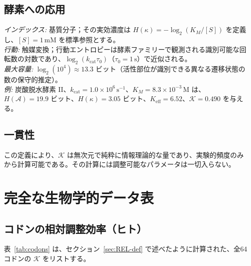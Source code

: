 \documentclass[12pt,a4paper]{ltjsarticle}
\newcommand{\REL}{\mathcal{K}}          %
\newcommand{\ABS}{K_{\mathrm{eff}}}     %
\begin{document}
	\subsection{酵素への応用}
	\textit{インデックス:} 基質分子；その実効濃度は \(H(\kappa) = -\log_2(K_M/[S])\) を定義し、\([S]=1\,\text{mM}\) を標準参照とする。\\
	\textit{行動:} 触媒変換；行動エントロピーは酵素ファミリーで観測される識別可能な回転数の対数であり、\(\log_2(k_{\mathrm{cat}}\tau_0)\)（\(\tau_0=1\,\text{s}\)）で近似される。\\
	\textit{最大容量:} \(\log_2(10^4)\approx13.3\) ビット（活性部位が識別できる異なる遷移状態の数の保守的推定）。\\
	\textit{例:} 炭酸脱水酵素 II、\(k_{\mathrm{cat}}=1.0\times10^6\,\text{s}^{-1}\)、\(K_M=8.3\times10^{-3}\,\text{M}\) は、\(H(\mathcal{A})=19.9\) ビット、\(H(\kappa)=3.05\) ビット、\(\ABS=6.52\)、\(\REL=0.490\) を与える。
	
	\subsection{一貫性}
	この定義により、\(\REL\) は無次元で純粋に情報理論的な量であり、実験的頻度のみから計算可能である。その計算には調整可能なパラメータは一切入らない。
	
	\section{完全な生物学的データ表}
	\label{sec:tables}
	
	\subsection{コドンの相対調整効率（ヒト）}
	\label{sec:codons}
	表~\ref{tab:codons} は、セクション~\ref{sec:REL-def} で述べたように計算された、全64コドンの \(\REL\) をリストする。
	
\end{document}

